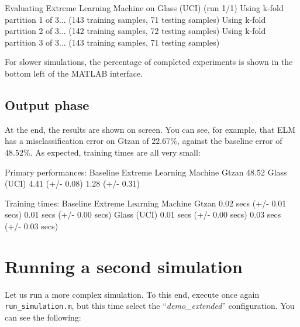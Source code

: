 \begin{console}
Evaluating Extreme Learning Machine on Glass (UCI) (run 1/1) 
   Using k-fold partition 1 of 3... (143 training samples, 
      71 testing samples)
   Using k-fold partition 2 of 3... (142 training samples, 
      72 testing samples)
   Using k-fold partition 3 of 3... (143 training samples, 
      71 testing samples)
\end{console}

\noindent For slower simulations, the percentage of completed experiments is shown in the bottom left of the MATLAB interface.

\subsection{Output phase}

At the end, the results are shown on screen. You can see, for example, that ELM has a misclassification error on Gtzan of $22.67\%$, against the baseline error of $48.52\%$. As expected, training times are all very small:

\begin{console}
Primary performances:
                       Baseline  Extreme Learning Machine
Gtzan        48.52%
Glass (UCI)     4.41 (+/- 0.08)           1.28 (+/- 0.31)
 
Training times:
                              Baseline   Extreme Learning Machine
Gtzan        0.02 secs (+/- 0.01 secs)  0.01 secs (+/- 0.00 secs)
Glass (UCI)  0.01 secs (+/- 0.00 secs)  0.03 secs (+/- 0.03 secs)
\end{console}

\section{Running a second simulation}

Let us run a more complex simulation. To this end, execute once again \verb|run_simulation.m|, but this time select the ``\textit{demo\_extended}'' configuration. You can see the following:


